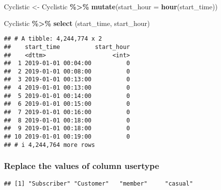 \documentclass[
]{article}
\newenvironment{Shaded}{\begin{snugshade}}{\end{snugshade}}
\newcommand{\AttributeTok}[1]{\textcolor[rgb]{0.13,0.29,0.53}{#1}}
\newcommand{\FunctionTok}[1]{\textcolor[rgb]{0.13,0.29,0.53}{\textbf{#1}}}
\newcommand{\NormalTok}[1]{#1}
\newcommand{\OtherTok}[1]{\textcolor[rgb]{0.56,0.35,0.01}{#1}}
\newcommand{\SpecialCharTok}[1]{\textcolor[rgb]{0.81,0.36,0.00}{\textbf{#1}}}
\newcommand{\StringTok}[1]{\textcolor[rgb]{0.31,0.60,0.02}{#1}}
\begin{document}
\begin{Shaded}
\begin{Highlighting}[]
\NormalTok{Cyclistic }\OtherTok{\textless{}{-}}\NormalTok{ Cyclistic }\SpecialCharTok{\%\textgreater{}\%} 
  \FunctionTok{mutate}\NormalTok{(}\AttributeTok{start\_hour =} \FunctionTok{hour}\NormalTok{(start\_time))}
\end{Highlighting}
\end{Shaded}

\begin{Shaded}
\begin{Highlighting}[]
\NormalTok{Cyclistic }\SpecialCharTok{\%\textgreater{}\%}
  \FunctionTok{select}\NormalTok{ (start\_time, start\_hour)}
\end{Highlighting}
\end{Shaded}

\begin{verbatim}
## # A tibble: 4,244,774 x 2
##    start_time          start_hour
##    <dttm>                   <int>
##  1 2019-01-01 00:04:00          0
##  2 2019-01-01 00:08:00          0
##  3 2019-01-01 00:13:00          0
##  4 2019-01-01 00:13:00          0
##  5 2019-01-01 00:14:00          0
##  6 2019-01-01 00:15:00          0
##  7 2019-01-01 00:16:00          0
##  8 2019-01-01 00:18:00          0
##  9 2019-01-01 00:18:00          0
## 10 2019-01-01 00:19:00          0
## # i 4,244,764 more rows
\end{verbatim}

\hypertarget{replace-the-values-of-column-usertype}{%
\subsubsection{Replace the values of column
usertype}\label{replace-the-values-of-column-usertype}}

\begin{Shaded}
\end{Shaded}

\begin{verbatim}
## [1] "Subscriber" "Customer"   "member"     "casual"
\end{verbatim}

\begin{Shaded}
\end{Shaded}
\end{document}
